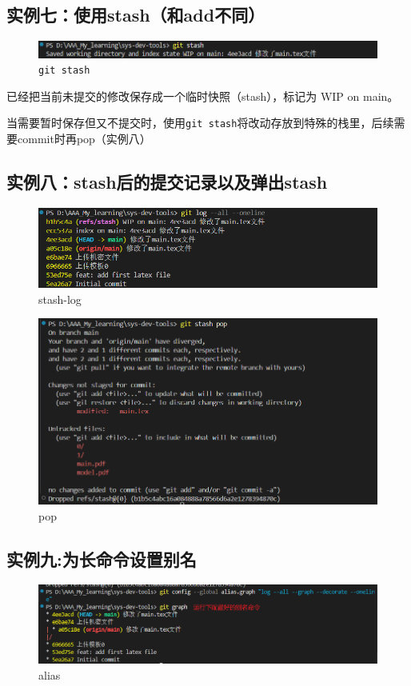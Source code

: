 \documentclass[a4paper]{article}
\begin{document}
\subsection{实例七：使用stash（和add不同）}

    \begin{figure}[H]
    \centering
    \includegraphics[width=1\textwidth]{images/stash.png}
    \caption{\texttt{git stash}}
    \end{figure}
    已经把当前未提交的修改保存成一个临时快照（stash），标记为 WIP on main。

    当需要暂时保存但又不提交时，使用\texttt{git stash}将改动存放到特殊的栈里，后续需要commit时再pop（实例八）
\subsection{实例八：stash后的提交记录以及弹出stash}
    \begin{figure}[H]
    \centering
    \includegraphics[width=1\textwidth]{images/stash-log.png}
    \caption{stash-log}
    \end{figure}
        \begin{figure}[H]
    \centering
    \includegraphics[width=1\textwidth]{images/pop.png}
    \caption{pop}
    \end{figure}

\subsection{实例九:为长命令设置别名}
    \begin{figure}[H]
    \centering
    \includegraphics[width=1\textwidth]{images/graph.png}
    \caption{alias}
    \end{figure}
\end{document}
